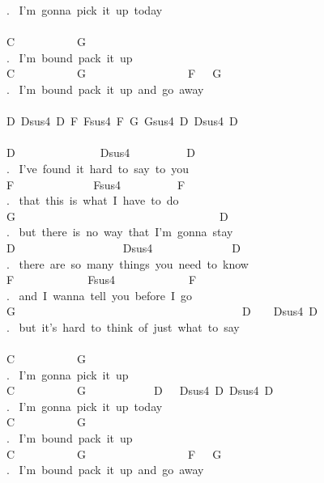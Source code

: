 {. \ I'm\ gonna\ pick\ it\ up\ today\\
\\
C\ \ \ \ \ \ \ \ \ \ \ G\\
. \ I'm\ bound\ pack\ it\ up\\
C\ \ \ \ \ \ \ \ \ \ \ G\ \ \ \ \ \ \ \ \ \ \ \ \ \ \ \ \ \ F\ \ \ G\\
. \ I'm\ bound\ pack\ it\ up\ and\ go\ away\\
\\
D\ Dsus4\ D\ F\ Fsus4\ F\ G\ Gsus4\ D\ Dsus4\ D\\
\\
D\ \ \ \ \ \ \ \ \ \ \ \ \ \ \ Dsus4\ \ \ \ \ \ \ \ \ \ D\ \\
. \ I've\ found\ it\ hard\ to\ say\ to\ you\\
F\ \ \ \ \ \ \ \ \ \ \ \ \ \ Fsus4\ \ \ \ \ \ \ \ \ \ F\\
. \ that\ this\ is\ what\ I\ have\ to\ do\\
G\ \ \ \ \ \ \ \ \ \ \ \ \ \ \ \ \ \ \ \ \ \ \ \ \ \ \ \ \ \ \ \ \ \ \ \ D\\
. \ but\ there\ is\ no\ way\ that\ I'm\ gonna\ stay\\
D\ \ \ \ \ \ \ \ \ \ \ \ \ \ \ \ \ \ \ Dsus4\ \ \ \ \ \ \ \ \ \ \ \ \ \ D\\
. \ there\ are\ so\ many\ things\ you\ need\ to\ know\\
F\ \ \ \ \ \ \ \ \ \ \ \ \ Fsus4\ \ \ \ \ \ \ \ \ \ \ \ \ F\\
. \ and\ I\ wanna\ tell\ you\ before\ I\ go\\
G\ \ \ \ \ \ \ \ \ \ \ \ \ \ \ \ \ \ \ \ \ \ \ \ \ \ \ \ \ \ \ \ \ \ \ \ \ \ \ \ D\ \ \ \ Dsus4\ D\ \\
. \ but\ it's\ hard\ to\ think\ of\ just\ what\ to\ say\\
\\
C\ \ \ \ \ \ \ \ \ \ \ G\\
. \ I'm\ gonna\ pick\ it\ up\\
C\ \ \ \ \ \ \ \ \ \ \ G\ \ \ \ \ \ \ \ \ \ \ \ D\ \ \ Dsus4\ D\ Dsus4\ D\\
. \ I'm\ gonna\ pick\ it\ up\ today\\
C\ \ \ \ \ \ \ \ \ \ \ G\\
. \ I'm\ bound\ pack\ it\ up\\
C\ \ \ \ \ \ \ \ \ \ \ G\ \ \ \ \ \ \ \ \ \ \ \ \ \ \ \ \ \ F\ \ \ G\\
. \ I'm\ bound\ pack\ it\ up\ and\ go\ away\\
\\
}
